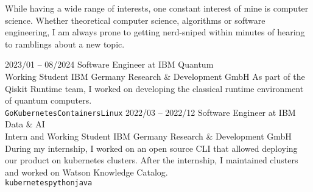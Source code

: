 \documentclass[9pt]{developercv} %
\begin{document}
\vspace{0.6cm}



\begin{minipage}[t]{0.5\textwidth} %
	\vspace{-\baselineskip} %
    While having a wide range of interests, one constant interest of mine is computer science. Whether theoretical computer science, algorithms or software engineering, I am always prone to getting nerd-sniped within minutes of hearing to ramblings about a new topic. 
\end{minipage}
\hfill %
\begin{minipage}[t]{0.4\textwidth} %
	\vspace{-\baselineskip} %
	\begin{barchart}{5.5}
	\end{barchart}
\end{minipage}






\begin{entrylist}
	\entry
		{2023/01 -- 08/2024}
		{Software Engineer at IBM Quantum\\\footnotesize{Working Student}}
		{IBM Germany Research \& Development GmbH}
		{As part of the Qiskit Runtime team, I worked on developing the classical runtime environment of quantum computers.
			\\ \texttt{Go}\slashsep\texttt{Kubernetes}\slashsep\texttt{Containers}\slashsep\texttt{Linux}}
	\entry
		{2022/03 -- 2022/12}
        {Software Engineer at IBM Data \& AI\\\footnotesize{Intern and Working Student}}
        {IBM Germany Research \& Development GmbH}
		{During my internship, I worked on an open source CLI that allowed deploying our product on kubernetes clusters. After the internship, I maintained clusters and worked on Watson Knowledge Catalog. 
		\\ \texttt{kubernetes}\slashsep\texttt{python}\slashsep\texttt{java}}
\end{entrylist}
\end{document}
